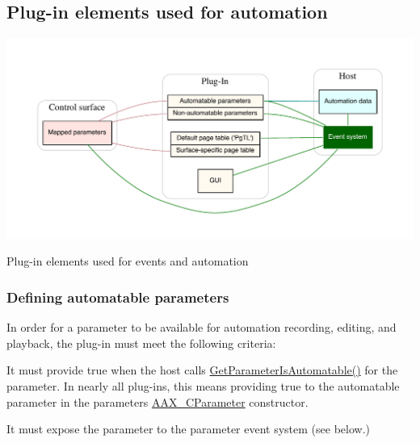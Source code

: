  \hypertarget{a00349_parameterAutomation_elements}{}\subsection{Plug-\/in elements used for automation}\label{a00349_parameterAutomation_elements}
 
\begin{DoxyImage}
\includegraphics[width=\textwidth,height=\textheight/2,keepaspectratio=true]{dot_aax_automation_components}
\caption{Plug-\/in elements used for events and automation}
\end{DoxyImage}
 \hypertarget{a00349_parameterAutomation_definingParameters}{}\subsubsection{Defining automatable parameters}\label{a00349_parameterAutomation_definingParameters}
 In order for a parameter to be available for automation recording, editing, and playback, the plug-\/in must meet the following criteria\+: \begin{DoxyItemize}
\item It must provide {\ttfamily true} when the host calls \hyperlink{a00061_a4e6eeef25a797ea4c6961df45174b169}{Get\+Parameter\+Is\+Automatable()} for the parameter. In nearly all plug-\/ins, this means providing {\ttfamily true} to the {\ttfamily automatable} parameter in the parameter\textquotesingle{}s \hyperlink{a00033}{A\+A\+X\+\_\+\+C\+Parameter} constructor. \item It must expose the parameter to the parameter event system (see below.)\end{DoxyItemize}
